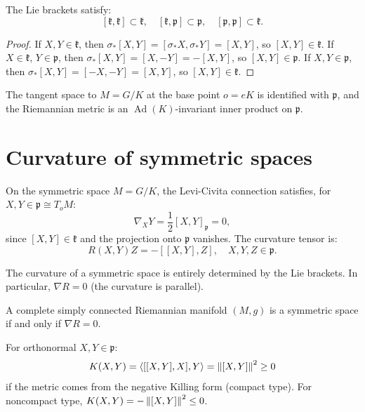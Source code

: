 \begin{proposition}
The Lie brackets satisfy:
\[
    [\mathfrak{k}, \mathfrak{k}] \subset \mathfrak{k}, \quad
    [\mathfrak{k}, \mathfrak{p}] \subset \mathfrak{p}, \quad
    [\mathfrak{p}, \mathfrak{p}] \subset \mathfrak{k}.
\]
\end{proposition}

\begin{proof}
If $X, Y \in \mathfrak{k}$, then $\sigma_*[X,Y] = [\sigma_*X, \sigma_*Y] = [X,Y]$,
so $[X,Y] \in \mathfrak{k}$. If $X \in \mathfrak{k}$, $Y \in \mathfrak{p}$,
then $\sigma_*[X,Y] = [X,-Y] = -[X,Y]$, so $[X,Y] \in \mathfrak{p}$.
If $X, Y \in \mathfrak{p}$, then $\sigma_*[X,Y] = [-X,-Y] = [X,Y]$,
so $[X,Y] \in \mathfrak{k}$.
\end{proof}

The tangent space to $M = G/K$ at the base point $o = eK$ is identified with
$\mathfrak{p}$, and the Riemannian metric is an $\operatorname{Ad}(K)$-invariant
inner product on $\mathfrak{p}$.

\section{Curvature of symmetric spaces}

\begin{theorem}
On the symmetric space $M = G/K$, the Levi-Civita connection satisfies, for
$X, Y \in \mathfrak{p} \cong T_oM$:
\[
    \nabla_X Y = \frac{1}{2}[X, Y]_\mathfrak{p} = 0,
\]
since $[X, Y] \in \mathfrak{k}$ and the projection onto $\mathfrak{p}$ vanishes.
The curvature tensor is:
\[
    R(X, Y)Z = -[[X, Y], Z], \quad X, Y, Z \in \mathfrak{p}.
\]
\end{theorem}

\begin{corollary}
The curvature of a symmetric space is entirely determined by the Lie brackets.
In particular, $\nabla R = 0$ (the curvature is parallel).
\end{corollary}

\begin{theorem}[Characterization by $\nabla R = 0$]
A complete simply connected Riemannian manifold $(M, g)$ is a symmetric space
if and only if $\nabla R = 0$.
\end{theorem}

\begin{proposition}
For orthonormal $X, Y \in \mathfrak{p}$:
\[
    K(X, Y) = \langle [[X,Y], X], Y \rangle = \left\| [X, Y] \right\|^2 \geq 0
\]
if the metric comes from the negative Killing form (compact type).
For noncompact type, $K(X,Y) = -\left\| [X,Y] \right\|^2 \leq 0$.
\end{proposition}

